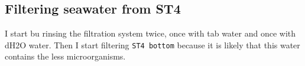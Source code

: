 \subsection{Filtering seawater from ST4}
\label{task:20180307_cj0}

I start bu rinsing the filtration system twice, once with tab water and once with dH2O water. Then I start filtering \texttt{ST4 bottom} because it is likely that this water contains the less microorganisms.